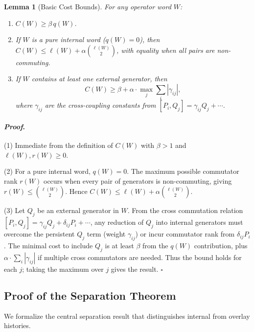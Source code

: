 \documentclass[12pt]{article}
\theoremstyle{plain}
\newtheorem{lemma}[theorem]{Lemma}
\theoremstyle{definition}
\theoremstyle{remark}
\renewenvironment{proof}{\paragraph{\textit{Proof}.}}{\hfill$\square$}
\begin{document}
\begin{lemma}[Basic Cost Bounds]
\label{lem:cost-bounds}
For any operator word $W$:
\begin{enumerate}
\item $C(W) \ge \beta \, q(W)$.
\item If $W$ is a pure internal word ($q(W)=0$), then $C(W) \le \ell(W) + \alpha \binom{\ell(W)}{2}$, with equality when all pairs are non-commuting.
\item If $W$ contains at least one external generator, then
\[
C(W) \ge \beta + \alpha \cdot \max_{j} \sum_i |\gamma_{ij}|,
\]
where $\gamma_{ij}$ are the cross-coupling constants from $[P_i,Q_j] = \gamma_{ij}Q_j + \cdots$.
\end{enumerate}
\end{lemma}

\begin{proof}
(1) Immediate from the definition of $C(W)$ with $\beta>1$ and $\ell(W), r(W)\ge 0$.

(2) For a pure internal word, $q(W)=0$. The maximum possible commutator rank $r(W)$ occurs when every pair of generators is non-commuting, giving $r(W) \le \binom{\ell(W)}{2}$. Hence $C(W) \le \ell(W) + \alpha \binom{\ell(W)}{2}$.

(3) Let $Q_j$ be an external generator in $W$. From the cross commutation relation $[P_i, Q_j] = \gamma_{ij} Q_j + \delta_{ij} P_i + \cdots$, any reduction of $Q_j$ into internal generators must overcome the persistent $Q_j$ term (weight $\gamma_{ij}$) or incur commutator rank from $\delta_{ij} P_i$. The minimal cost to include $Q_j$ is at least $\beta$ from the $q(W)$ contribution, plus $\alpha \cdot \sum_i |\gamma_{ij}|$ if multiple cross commutators are needed. Thus the bound holds for each $j$; taking the maximum over $j$ gives the result.
\end{proof}

\subsection{Proof of the Separation Theorem}

We formalize the central separation result that distinguishes internal from overlay histories.
\end{document}

